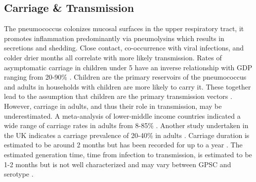 \documentclass{article}
\begin{document}
\subsection{Carriage \& Transmission} 
The pneumococcus colonizes mucosal surfaces in the upper respiratory tract, it promotes inflammation predominantly via pneumolysins which results in secretions and shedding. Close contact, co-occurrence with viral infections, and colder drier months all correlate with more likely transmission\cite{weiserStreptococcusPneumoniaeTransmission2018}. Rates of asymptomatic carriage in children under 5 have an inverse relationship with GDP ranging from 20-90\% 
\cite{almeidaDynamicsPneumococcalCarriage2020,adegbolaCarriageStreptococcusPneumoniae2014}. Children are the primary reservoirs of the pneumococcus and adults in households with children are more likely to carry it. These together lead to the assumption that children are the primary transmission vectors \cite{almeidaDynamicsPneumococcalCarriage2020,bogaertStreptococcusPneumoniaeColonisation2004}. However, carriage in adults, and thus their role in transmission, may be underestimated. A meta-analysis of lower-middle income countries indicated a wide range of carriage rates in adults from 8-85\% \cite{adegbolaCarriageStreptococcusPneumoniae2014}. Another study undertaken in the UK indicates a carriage prevalence of 20-40\% in adults\cite{almeidaDynamicsPneumococcalCarriage2020} . Carriage duration is estimated to be around 2 months but has been recorded for up to a year \cite{almeidaDynamicsPneumococcalCarriage2020,dubeLongitudinalCharacterizationNasopharyngeal2018}. The estimated generation time, time from infection to transmission, is estimated to be 1-2 months but is not well characterized and may vary between GPSC and serotype \cite{leesGenomewideIdentificationLineage2017}.
\end{document}
